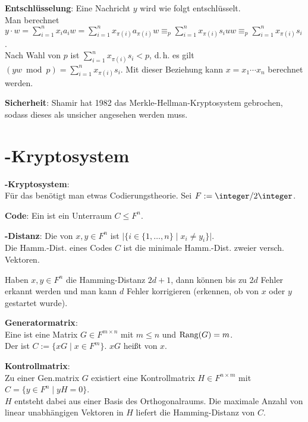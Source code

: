 \textbf{Entschlüsselung}:
Eine Nachricht $y$ wird wie folgt entschlüsselt.\\
Man berechnet $y \cdot w = \sum_{i=1}^n x_i a_i w
= \sum_{i=1}^n x_{\pi(i)} a_{\pi(i)} w
\equiv_p \sum_{i=1}^n x_{\pi(i)} s_i uw
\equiv_p \sum_{i=1}^n x_{\pi(i)} s_i$.\\
Nach Wahl von $p$ ist $\sum_{i=1}^n x_{\pi(i)} s_i < p$, d.\,h. es gilt
$(yw \bmod p) = \sum_{i=1}^n x_{\pi(i)} s_i$.
Mit dieser Beziehung kann $x = x_1 \dotsb x_n$ berechnet werden.

\linie

\textbf{Sicherheit}:
Shamir hat 1982 das Merkle-Hellman-Kryptosystem gebrochen,
sodass dieses als unsicher angesehen werden muss.

\pagebreak

\section{%
    -Kryptosystem%
}

\textbf{-Kryptosystem}:\\
Für das  benötigt man etwas Codierungstheorie.
Sei $F := \integer/2\integer$.

\textbf{Code}:
Ein  ist ein Unterraum $C \le F^n$.

\textbf{-Distanz}:
Die  von $x, y \in F^n$ ist
$|\{i \in \{1, \dotsc, n\} \;|\; x_i \not= y_i\}|$.\\
Die Hamm.-Dist. eines Codes $C$ ist die minimale Hamm.-Dist. zweier versch. Vektoren.

Haben $x, y \in F^n$ die Hamming-Distanz $2d + 1$, dann können bis zu $2d$ Fehler erkannt werden
und man kann $d$ Fehler korrigieren (erkennen, ob von $x$ oder $y$ gestartet wurde).

\textbf{Generatormatrix}:\\
Eine  ist eine Matrix $G \in F^{m \times n}$ mit $m \le n$ und
$\operatorname{Rang}(G) = m$.\\
Der  ist $C := \{xG \;|\; x \in F^m\}$.
$xG$ heißt  von $x$.

\textbf{Kontrollmatrix}:\\
Zu einer Gen.matrix $G$ existiert eine Kontrollmatrix $H \in F^{n \times m}$ mit
$C = \{y \in F^n \;|\; yH = 0\}$.\\
$H$ entsteht dabei aus einer Basis des Orthogonalraums.
Die maximale Anzahl von linear unabhängigen Vektoren in $H$ liefert die Hamming-Distanz von $C$.

